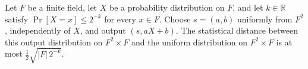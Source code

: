 \begin{theorem}
\label{TCSlib.InformationTheory.leftover_hash_affine}
\leanok
{}
Let $F$ be a finite field, let $X$ be a probability distribution on $F$, and let
$k\in\mathbb{R}$ satisfy $\Pr[X=x]\le 2^{-k}$ for every $x\in F$. Choose $s=(a,b)$
uniformly from $F^2$, independently of $X$, and output $(s, aX+b)$. The statistical
distance between this output distribution on $F^2\times F$ and the uniform distribution
on $F^2\times F$ is at most $\frac12\sqrt{|F|\,2^{-k}}$.
\end{theorem}
